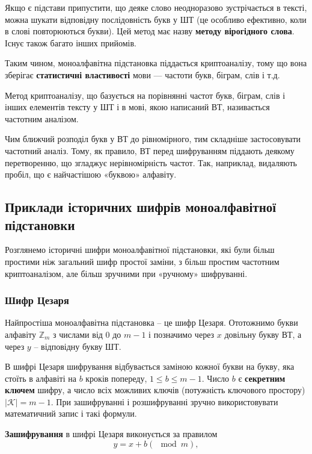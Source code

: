 Якщо є підстави припустити, що деяке слово неодноразово
зустрічається в тексті, можна шукати відповідну послідовність букв у ШТ (це
особливо ефективно, коли в слові повторюються букви). Цей метод має назву
\textbf{методу вірогідного слова}. Існує також багато інших прийомів.

Таким чином, моноалфавітна підстановка піддається криптоаналізу,
тому що вона зберігає \textbf{статистичні властивості} мови --- частоти
букв, біграм, слів і т.д.

\begin{definition}
    Метод криптоаналізу, що базується на порівнянні
    частот букв, біграм, слів і інших елементів тексту у ШТ і в мові, якою
    написаний ВТ, називається частотним аналізом.
\end{definition}

Чим ближчий розподіл букв у ВТ до рівномірного, тим складніше
застосовувати частотний аналіз. Тому, як правило, ВТ перед шифруванням
піддають деякому перетворенню, що згладжує нерівномірність частот. Так,
наприклад, видаляють пробіл, що є найчастішою «буквою» алфавіту.

\subsection{Приклади історичних шифрів моноалфавітної підстановки}

Розглянемо історичні шифри моноалфавітної підстановки, які були більш
простими ніж загальний шифр простої заміни, з більш простим частотним
криптоаналізом, але більш зручними при «ручному» шифруванні.

\subsubsection{Шифр Цезаря}

Найпростіша моноалфавітна підстановка – це шифр Цезаря.
Ототожнимо букви алфавіту $\mathbb{Z}_m$ з числами від $0$ до $m-1$ і позначимо через $x$
довільну букву ВТ, а через $y$ – відповідну букву ШТ.

В шифрі Цезаря шифрування відбувається заміною кожної букви на
букву, яка стоїть в алфавіті на $b$ кроків попереду,
$1 \leqslant b \leqslant m-1$. Число $b$ є
\textbf{секретним ключем} шифру, а число всіх можливих ключів (потужність
ключового простору) $|\mathcal{K}| = m-1$. При зашифруванні і розшифруванні зручно
використовувати математичний запис і такі формули.

\textbf{Зашифрування} в шифрі Цезаря виконується за правилом
$$y = x + b (\mod m),$$

